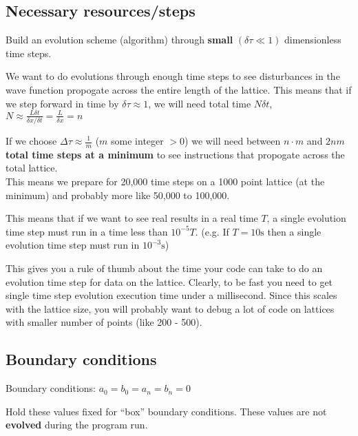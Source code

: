 \documentclass[11pt,letterpaper]{article}
\begin{document}
	\subsection{Necessary resources/steps}
	\begin{description}[leftmargin=6em,style=nextline]
		\item[Next] Build an evolution scheme (algorithm) through \textbf{small} $(\delta \tau \ll 1)$ dimensionless time steps.
		\item[Tradeoff] We want to do evolutions through enough time steps to see disturbances in the wave function propogate across the entire length of the lattice. This means that if we step forward in time by $\delta \tau \approx 1$, we will need total time $N\delta t$, $N \approx \frac{L\delta t}{\delta x / \delta t} = \frac{L}{\delta x} = n$\par
	\end{description}
	If we choose $\Delta \tau \approx \frac{1}{m}$ ($m$ some integer $> 0$) we will need between $n \cdot m$ and \textbf{$2nm$ total time steps at a minimum} to see instructions that propogate across the total lattice.\\
	This means we prepare for 20,000 time steps on a 1000 point lattice (at the minimum) and probably more like 50,000 to 100,000.\par
	This means that if we want to see real results in a real time $T$, a single evolution time step must run in a time less than $10^{-5} T$. (e.g. If $T=10\si{\second}$ then a single evolution time step must run in $10^{-3}\si{\second}$)\par
	This gives you a rule of thumb about the time your code can take to do an evolution time step for data on the lattice. Clearly, to be fast you need to get single time step evolution execution time under a millisecond. Since this scales with the lattice size, you will probably want to debug a lot of code on lattices with smaller number of points (like 200 - 500).
	\subsection{Boundary conditions}
	Boundary conditions: $a_0=b_0=a_n=b_n=0$\par
	Hold these values fixed for ``box'' boundary conditions. These values are not \textbf{evolved} during the program run.
\end{document}
